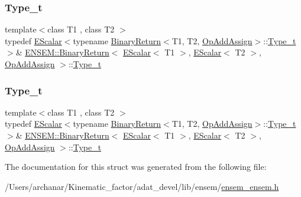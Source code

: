 \subsubsection{\texorpdfstring{Type\_t}{Type\_t}\hspace{0.1cm}{\footnotesize\ttfamily [1/2]}}
{\footnotesize\ttfamily template$<$class T1 , class T2 $>$ \\
typedef \mbox{\hyperlink{classENSEM_1_1EScalar}{E\+Scalar}}$<$typename \mbox{\hyperlink{structENSEM_1_1BinaryReturn}{Binary\+Return}}$<$T1, T2, \mbox{\hyperlink{structENSEM_1_1OpAddAssign}{Op\+Add\+Assign}}$>$\+::\mbox{\hyperlink{structENSEM_1_1BinaryReturn_3_01EScalar_3_01T1_01_4_00_01EScalar_3_01T2_01_4_00_01OpAddAssign_01_4_ad164ca2eb4612dd3d345ede329e0a944}{Type\+\_\+t}}$>$\& \mbox{\hyperlink{structENSEM_1_1BinaryReturn}{E\+N\+S\+E\+M\+::\+Binary\+Return}}$<$ \mbox{\hyperlink{classENSEM_1_1EScalar}{E\+Scalar}}$<$ T1 $>$, \mbox{\hyperlink{classENSEM_1_1EScalar}{E\+Scalar}}$<$ T2 $>$, \mbox{\hyperlink{structENSEM_1_1OpAddAssign}{Op\+Add\+Assign}} $>$\+::\mbox{\hyperlink{structENSEM_1_1BinaryReturn_3_01EScalar_3_01T1_01_4_00_01EScalar_3_01T2_01_4_00_01OpAddAssign_01_4_ad164ca2eb4612dd3d345ede329e0a944}{Type\+\_\+t}}}

\mbox{\label{structENSEM_1_1BinaryReturn_3_01EScalar_3_01T1_01_4_00_01EScalar_3_01T2_01_4_00_01OpAddAssign_01_4_ad164ca2eb4612dd3d345ede329e0a944}} 
\subsubsection{\texorpdfstring{Type\_t}{Type\_t}\hspace{0.1cm}{\footnotesize\ttfamily [2/2]}}
{\footnotesize\ttfamily template$<$class T1 , class T2 $>$ \\
typedef \mbox{\hyperlink{classENSEM_1_1EScalar}{E\+Scalar}}$<$typename \mbox{\hyperlink{structENSEM_1_1BinaryReturn}{Binary\+Return}}$<$T1, T2, \mbox{\hyperlink{structENSEM_1_1OpAddAssign}{Op\+Add\+Assign}}$>$\+::\mbox{\hyperlink{structENSEM_1_1BinaryReturn_3_01EScalar_3_01T1_01_4_00_01EScalar_3_01T2_01_4_00_01OpAddAssign_01_4_ad164ca2eb4612dd3d345ede329e0a944}{Type\+\_\+t}}$>$\& \mbox{\hyperlink{structENSEM_1_1BinaryReturn}{E\+N\+S\+E\+M\+::\+Binary\+Return}}$<$ \mbox{\hyperlink{classENSEM_1_1EScalar}{E\+Scalar}}$<$ T1 $>$, \mbox{\hyperlink{classENSEM_1_1EScalar}{E\+Scalar}}$<$ T2 $>$, \mbox{\hyperlink{structENSEM_1_1OpAddAssign}{Op\+Add\+Assign}} $>$\+::\mbox{\hyperlink{structENSEM_1_1BinaryReturn_3_01EScalar_3_01T1_01_4_00_01EScalar_3_01T2_01_4_00_01OpAddAssign_01_4_ad164ca2eb4612dd3d345ede329e0a944}{Type\+\_\+t}}}



The documentation for this struct was generated from the following file\+:\begin{DoxyCompactItemize}
\item 
/\+Users/archanar/\+Kinematic\+\_\+factor/adat\+\_\+devel/lib/ensem/\mbox{\hyperlink{lib_2ensem_2ensem__ensem_8h}{ensem\+\_\+ensem.\+h}}\end{DoxyCompactItemize}
